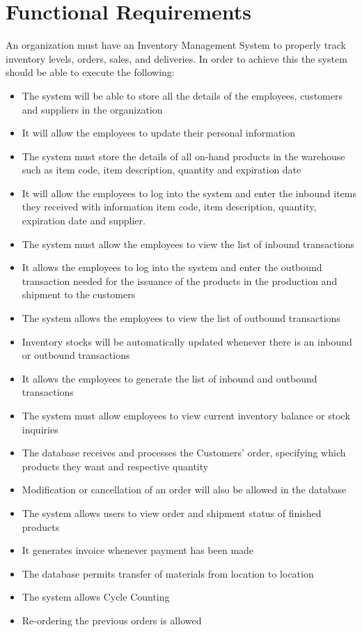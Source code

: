 \section{Functional Requirements}

An organization must have an Inventory Management System to properly track inventory levels, orders, sales, and deliveries. In order to achieve this the system should be able to execute the following:

\begin{itemize}
    \item The system will be able to store all the details of the employees, customers and suppliers in the organization
    \item It will allow the employees to update their personal information
    \item The system must store the details of all on-hand products in the warehouse such as item code, item description, quantity and expiration date
    \item It will allow the employees to log into the system and enter the inbound items they received with information item code, item description, quantity, expiration date and supplier. 
    \item The system must allow the employees to view the list of inbound transactions
    \item It allows the employees to log into the system and enter the outbound transaction needed for the issuance of the products in the production and shipment to the customers
    \item The system allows the employees to view the list of outbound transactions
    \item Inventory stocks will be automatically updated whenever there is an inbound or outbound transactions
    \item It allows the employees to generate the list of inbound and outbound transactions 
    \item The system must allow employees to view current inventory balance or stock inquiries
    \item The database receives and processes the Customers’ order, specifying which products they want and respective quantity
    \item Modification or cancellation of an order will also be allowed in the database
    \item The system allows users to view order and shipment status of finished products
    \item It generates invoice whenever payment has been made
    \item The database permits transfer of materials from location to location
    \item The system allows Cycle Counting
    \item Re-ordering the previous orders is allowed
\end{itemize}